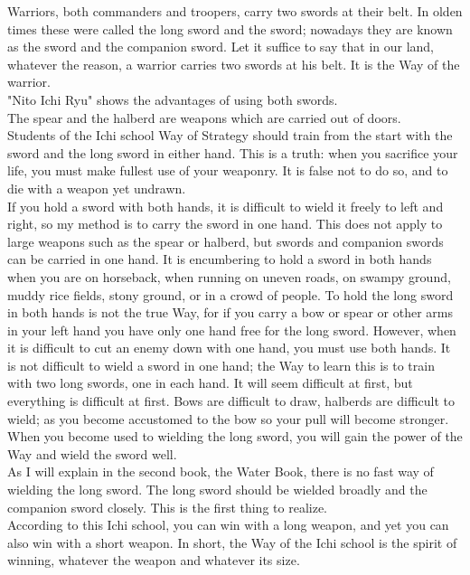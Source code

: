 Warriors, both commanders and troopers, carry two swords at their belt. In olden times these were called the long sword and the sword; nowadays they are known as the sword and the companion sword. Let it suffice to say that in our land, whatever the reason, a warrior carries two swords at his belt. It is the Way of the warrior.\\

"Nito Ichi Ryu" shows the advantages of using both swords.\\

The spear and the halberd are weapons which are carried out of doors.\\

Students of the Ichi school Way of Strategy should train from the start with the sword and the long sword in either hand. This is a truth: when you sacrifice your life, you must make fullest use of your weaponry. It is false not to do so, and to die with a weapon yet undrawn.\\

If you hold a sword with both hands, it is difficult to wield it freely to left and right, so my method is to carry the sword in one hand. This does not apply to large weapons such as the spear or halberd, but swords and companion swords can be carried in one hand. It is encumbering to hold a sword in both hands when you are on horseback, when running on uneven roads, on swampy ground, muddy rice fields, stony ground, or in a crowd of people. To hold the long sword in both hands is not the true Way, for if you carry a bow or spear or other arms in your left hand you have only one hand free for the long sword. However, when it is difficult to cut an enemy down with one hand, you must use both hands. It is not difficult to wield a sword in one hand; the Way to learn this is to train with two long swords, one in each hand. It will seem difficult at first, but everything is difficult at first. Bows are difficult to draw, halberds are difficult to wield; as you become accustomed to the bow so your pull will become stronger. When you become used to wielding the long sword, you will gain the power of the Way and wield the sword well.\\

As I will explain in the second book, the Water Book, there is no fast way of wielding the long sword. The long sword should be wielded broadly and the companion sword closely. This is the first thing to realize.\\

According to this Ichi school, you can win with a long weapon, and yet you can also win with a short weapon. In short, the Way of the Ichi school is the spirit of winning, whatever the weapon and whatever its size.\\

